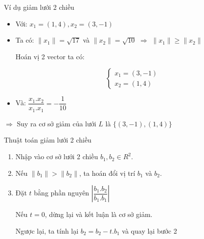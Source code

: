 \documentclass{beamer}
\numberwithin{equation}{section}
\begin{document}
\begin{frame}{Ví dụ giảm lưới 2 chiều}
\begin{itemize}

\item Với: $x_1 = (1, 4), x_2 = (3, -1)$
\item Ta có: $\|x_1\|= \sqrt{17}$ và $\|x_2\| = \sqrt{10}$ $\Rightarrow$ $\|x_1\| \geq \|x_2\|$

Hoán vị 2 vector ta có:

$$\begin{cases}
x_1 = (3, -1)\\
x_2 = (1, 4)
\end{cases}$$

\item Và: $\dfrac{x_1.x_2}{x_1.x_1} = -\dfrac{1}{10}$

\end{itemize}

$\Rightarrow$ Suy ra cơ sở giảm của lưới $L$ là $\{(3, -1), (1, 4)\}$

\end{frame}
\begin{frame}{Thuật toán giảm lưới 2 chiều}

\begin{enumerate}
\item Nhập vào cơ sở lưới 2 chiều ${b_1, b_2} \in R^2$.
\item Nếu $\|b_1\| > \|b_2\|$, ta hoán đổi vị trí $b_1$ và $b_2$.
\item Đặt $t$ bằng phần nguyên $\left|\dfrac{b_1.b_2}{b_1.b_1}\right|$


Nếu $t = 0$, dừng lại và kết luận là cơ sở giảm.

Ngược lại, ta tính lại $b_2 = b_2 - t.b_1$ và quay lại bước 2
\end{enumerate}

\end{frame}
\end{document}
